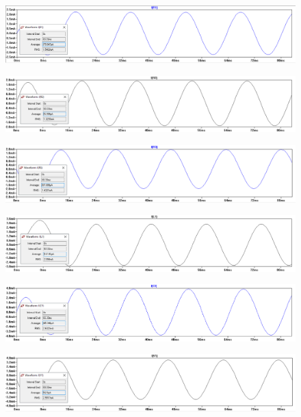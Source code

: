 \documentclass[letterpaper]{article}
\begin{document}
\begin{figure}[H]
    \centering
    \includegraphics[width=\linewidth]{nod-ir1}
\end{figure}
\begin{figure}[H]
    \centering
    \includegraphics[width=\linewidth]{nod-ir2}
\end{figure}
\begin{figure}[H]
    \centering
    \includegraphics[width=\linewidth]{nod-ir3}
\end{figure}
\begin{figure}[H]
    \centering
    \includegraphics[width=\linewidth]{nod-il}
\end{figure}
\begin{figure}[H]
    \centering
    \includegraphics[width=\linewidth]{nod-ic}
\end{figure}
\begin{figure}[H]
    \centering
    \includegraphics[width=\linewidth]{nod-is}
\end{figure}
\end{document}
